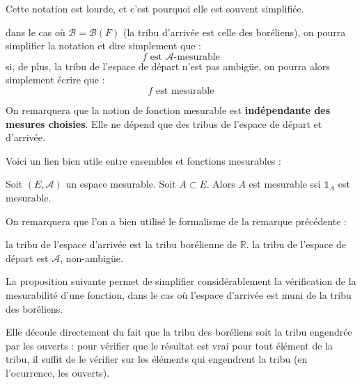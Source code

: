 \documentclass[../integ-proba.tex]{subfiles}
\begin{document}
  \begin{rem}
    \label{rem:simplification_notation_fonctions_mesurables}
    Cette notation est lourde, et c'est pourquoi elle est souvent simplifiée.
    \begin{itemize}
    \itemb dans le cas où $\mathcal{B}=\mathcal{B}\left(F\right)$ (la tribu d'arrivée est celle des boréliens), on pourra simplifier la notation et dire simplement que :
    \begin{displaymath}
      f \text{ est } \mathcal{A}\text{-mesurable}
    \end{displaymath}
    \itemb si, de plus, la tribu de l'espace de départ n'est pas ambigüe, on pourra alors simplement écrire que :
    \begin{displaymath}
      f \text{ est mesurable}
    \end{displaymath}
    \end{itemize}
  \end{rem}

  \begin{rem}
    On remarquera que la notion de fonction mesurable est \textbf{indépendante des mesures choisies}.
    Elle ne dépend que des tribus de l'espace de départ et d'arrivée.
  \end{rem}

  Voici un lien bien utile entre ensembles et fonctions mesurables :

  \begin{prop}
    \label{prop:lienensfctmes}
    Soit $\left(E, \mathcal{A}\right)$ un espace mesurable.
    Soit $A\subset E$.
    Alors $A$ est mesurable ssi $\mathds{1}_A$ est mesurable.
  \end{prop}

  \begin{rem}
    On remarquera que l'on a bien utilisé le formalisme de la remarque précédente :
    \begin{itemize}
      \itemb la tribu de l'espace d'arrivée est la tribu borélienne de $\mathbb{R}$.
      \itemb la tribu de l'espace de départ est $\mathcal{A}$, non-ambigüe.
    \end{itemize}
  \end{rem}

  La proposition suivante permet de simplifier considérablement la vérification de la mesurabilité d'une fonction, dans le cas où l'espace d'arrivée est muni de la tribu des boréliens.

  Elle découle directement du fait que la tribu des boréliens soit la tribu engendrée par les ouverts :
  pour vérifier que le résultat est vrai pour tout élément de la tribu, il suffit de le vérifier sur les éléments qui engendrent la tribu (en l'ocurrence, les ouverts).
\end{document}
